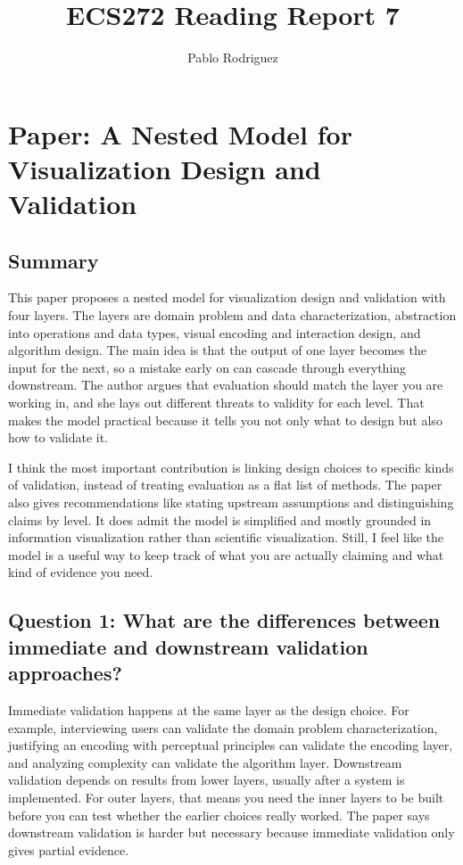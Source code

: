 \documentclass[11pt]{article}
\title{ECS272 Reading Report 7}
\author{Pablo Rodriguez}
\date{}
\begin{document}
\maketitle

\section*{Paper: A Nested Model for Visualization Design and Validation}

\subsection*{Summary}

This paper proposes a nested model for visualization design and validation with four layers. The layers are domain problem and data characterization, abstraction into operations and data types, visual encoding and interaction design, and algorithm design. The main idea is that the output of one layer becomes the input for the next, so a mistake early on can cascade through everything downstream. The author argues that evaluation should match the layer you are working in, and she lays out different threats to validity for each level. That makes the model practical because it tells you not only what to design but also how to validate it.

I think the most important contribution is linking design choices to specific kinds of validation, instead of treating evaluation as a flat list of methods. The paper also gives recommendations like stating upstream assumptions and distinguishing claims by level. It does admit the model is simplified and mostly grounded in information visualization rather than scientific visualization. Still, I feel like the model is a useful way to keep track of what you are actually claiming and what kind of evidence you need.

\subsection*{Question 1: What are the differences between immediate and downstream validation approaches?}

Immediate validation happens at the same layer as the design choice. For example, interviewing users can validate the domain problem characterization, justifying an encoding with perceptual principles can validate the encoding layer, and analyzing complexity can validate the algorithm layer. Downstream validation depends on results from lower layers, usually after a system is implemented. For outer layers, that means you need the inner layers to be built before you can test whether the earlier choices really worked. The paper says downstream validation is harder but necessary because immediate validation only gives partial evidence.
\end{document}
